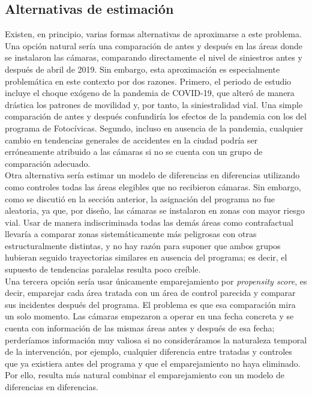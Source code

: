\subsection{Alternativas de estimación}
\noindent Existen, en principio, varias formas alternativas de aproximarse a este problema. Una opción natural sería una comparación de antes y después en las áreas donde se instalaron las cámaras, comparando directamente el nivel de siniestros antes y después de abril de 2019. Sin embargo, esta aproximación es especialmente problemática en este contexto por dos razones. Primero, el periodo de estudio incluye el choque exógeno de la pandemia de COVID-19, que alteró de manera drástica los patrones de movilidad y, por tanto, la siniestralidad vial. Una simple comparación de antes y después confundiría los efectos de la pandemia con los del programa de Fotocívicas. Segundo, incluso en ausencia de la pandemia, cualquier cambio en tendencias generales de accidentes en la ciudad podría ser erróneamente atribuido a las cámaras si no se cuenta con un grupo de comparación adecuado.\\

Otra alternativa sería estimar un modelo de diferencias en diferencias utilizando como controles todas las áreas elegibles que no recibieron cámaras. Sin embargo, como se discutió en la sección anterior, la asignación del programa no fue aleatoria, ya que, por diseño, las cámaras se instalaron en zonas con mayor riesgo vial. Usar de manera indiscriminada todas las demás áreas como contrafactual llevaría a comparar zonas sistemáticamente más peligrosas con otras estructuralmente distintas, y no hay razón para suponer que ambos grupos hubieran seguido trayectorias similares en ausencia del programa; es decir, el supuesto de tendencias paralelas resulta poco creíble.\\

Una tercera opción sería usar únicamente emparejamiento por \emph{propensity score}, es decir, emparejar cada área tratada con un área de control parecida y comparar sus incidentes después del programa. El problema es que esa comparación mira un solo momento. Las cámaras empezaron a operar en una fecha concreta y se cuenta con información de las mismas áreas antes y después de esa fecha; perderíamos información muy valiosa si no consideráramos la naturaleza temporal de la intervención, por ejemplo, cualquier diferencia entre tratadas y controles que ya existiera antes del programa y que el emparejamiento no haya eliminado. Por ello, resulta más natural combinar el emparejamiento con un modelo de diferencias en diferencias.\\

